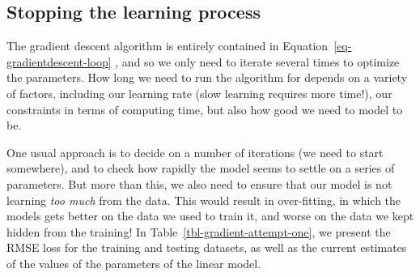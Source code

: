 \documentclass[
  letterpaper,
]{scrbook}
\begin{document}
\subsection{Stopping the learning
process}\label{stopping-the-learning-process}

The gradient descent algorithm is entirely contained in
Equation~\ref{eq-gradientdescent-loop} , and so we only need to iterate
several times to optimize the parameters. How long we need to run the
algorithm for depends on a variety of factors, including our learning
rate (slow learning requires more time!), our constraints in terms of
computing time, but also how good we need to model to be.


One usual approach is to decide on a number of iterations (we need to
start somewhere), and to check how rapidly the model seems to settle on
a series of parameters. But more than this, we also need to ensure that
our model is not learning \emph{too much} from the data. This would
result in over-fitting, in which the models gets better on the data we
used to train it, and worse on the data we kept hidden from the
training! In Table~\ref{tbl-gradient-attempt-one}, we present the RMSE
loss for the training and testing datasets, as well as the current
estimates of the values of the parameters of the linear model.
\end{document}
